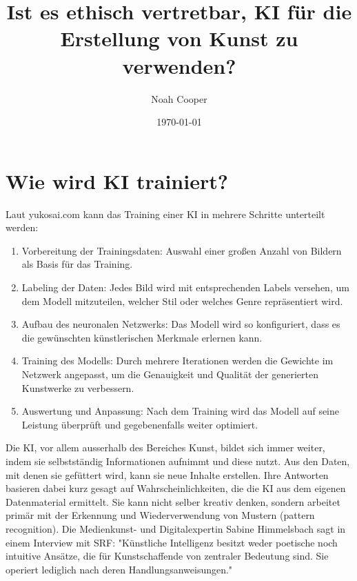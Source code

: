 \documentclass{article}
\title{Ist es ethisch vertretbar, KI für die Erstellung von Kunst zu verwenden?}
\author{Noah Cooper}
\date{\today}
\begin{document}
\maketitle


\tableofcontents

\newpage



\section{Wie wird KI trainiert?}
    Laut yukosai.com kann das Training einer KI in mehrere Schritte unterteilt werden:
    \begin{enumerate}
        \item Vorbereitung der Trainingsdaten: Auswahl einer großen Anzahl von Bildern als Basis für das Training.
        \item Labeling der Daten: Jedes Bild wird mit entsprechenden Labels versehen, um dem Modell mitzuteilen, welcher Stil oder welches Genre repräsentiert wird.
        \item Aufbau des neuronalen Netzwerks: Das Modell wird so konfiguriert, dass es die gewünschten künstlerischen Merkmale erlernen kann.
        \item Training des Modells: Durch mehrere Iterationen werden die Gewichte im Netzwerk angepasst, um die Genauigkeit und Qualität der generierten Kunstwerke zu verbessern.
        \item Auswertung und Anpassung: Nach dem Training wird das Modell auf seine Leistung überprüft und gegebenenfalls weiter optimiert.
    \end{enumerate}
    Die KI, vor allem ausserhalb des Bereiches Kunst, bildet sich immer weiter, indem sie selbstständig Informationen aufnimmt und diese nutzt. Aus den Daten, mit denen sie gefüttert wird, kann sie neue Inhalte erstellen. Ihre Antworten basieren dabei kurz gesagt auf Wahrscheinlichkeiten, die die KI aus dem eigenen Datenmaterial ermittelt.  
    \newline Sie kann nicht selber kreativ denken, sondern arbeitet primär mit der Erkennung und Wiederverwendung von Mustern (pattern recognition). Die Medienkunst- und Digitalexpertin Sabine Himmelsbach sagt in einem Interview mit SRF: "Künstliche Intelligenz besitzt weder poetische noch intuitive Ansätze, die für Kunstschaffende von zentraler Bedeutung sind. Sie operiert lediglich nach deren Handlungsanweisungen." 
    
\end{document}
